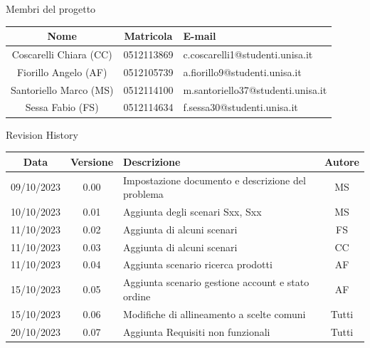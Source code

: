 \documentclass[12pt, a4paper, oneside]{book}
\begin{document}
    \newpage
    \begin{center}
    {\LARGE{Membri del progetto}}
    \end{center}
    \begin{center}
        \begin{tabular}{|c|c|m{8cm}|}
            \hline
            \cellcolor{lightgray} \textbf{Nome} & \cellcolor{lightgray} \textbf{Matricola} & \cellcolor{lightgray} \textbf{E-mail}\\ \hline
            Coscarelli Chiara (CC) & 0512113869 & c.coscarelli1@studenti.unisa.it\\ \hline
            Fiorillo Angelo (AF) & 0512105739 & a.fiorillo9@studenti.unisa.it\\ \hline
            Santoriello Marco (MS) &  0512114100 & m.santoriello37@studenti.unisa.it\\ \hline
            Sessa Fabio (FS) & 0512114634 & f.sessa30@studenti.unisa.it\\ \hline
        \end{tabular}
    \end{center}

    \begin{center}
    {\LARGE{Revision History}}
    \end{center}

    \begin{center}
        \begin{tabular}{|c|c|m{8cm}|c|}
            \hline
            \cellcolor{lightgray} \textbf{Data} & \cellcolor{lightgray} \textbf{Versione} & \cellcolor{lightgray} \textbf{Descrizione} & \cellcolor{lightgray} \textbf{Autore}\\ \hline
            09/10/2023 & 0.00 & Impostazione documento e descrizione del problema & MS\\ \hline
            10/10/2023 & 0.01 & Aggiunta degli scenari Sxx, Sxx & MS\\ \hline
            11/10/2023 & 0.02 & Aggiunta di alcuni scenari & FS\\ \hline
            11/10/2023 & 0.03 & Aggiunta di alcuni scenari & CC\\ \hline
            11/10/2023 & 0.04 & Aggiunta scenario ricerca prodotti & AF\\ \hline
            15/10/2023 & 0.05 & Aggiunta scenario gestione account e stato ordine & AF\\ \hline
            15/10/2023 & 0.06 & Modifiche di allineamento a scelte comuni & Tutti\\ \hline
            20/10/2023 & 0.07 & Aggiunta Requisiti non funzionali & Tutti\\ \hline
        \end{tabular}
    \end{center}
\end{document}
